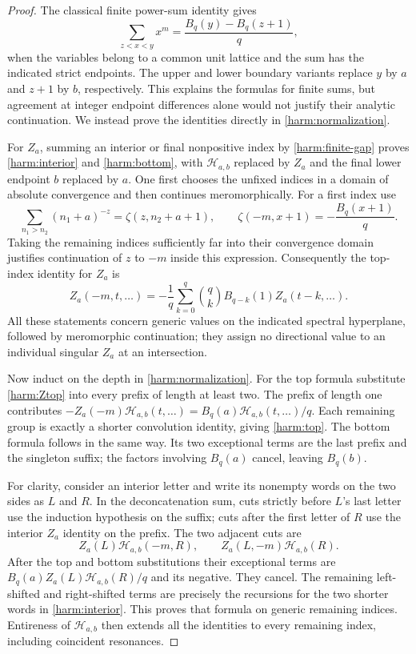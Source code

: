 \begin{proof}
The classical finite power-sum identity \cite{DLMF} gives
\begin{equation}
 \sum_{z<x<y}x^m=\frac{B_q(y)-B_q(z+1)}q,
 \label{harm:finite-gap}
\end{equation}
when the variables belong to a common unit lattice and the sum has the
indicated strict endpoints. The upper and lower boundary variants
replace $y$ by $a$ and $z+1$ by $b$, respectively. This explains the
formulas for finite sums, but agreement at integer endpoint differences
alone would not justify their analytic continuation. We instead prove
the identities directly in \eqref{harm:normalization}.

For $Z_a$, summing an interior or final nonpositive index by
\eqref{harm:finite-gap} proves \eqref{harm:interior} and
\eqref{harm:bottom}, with $\mathcal H_{a,b}$ replaced by $Z_a$ and
the final lower endpoint $b$ replaced by $a$. One first chooses the
unfixed indices in a domain of absolute convergence and then continues
meromorphically. For a first index use
\[
 \sum_{n_1>n_2}(n_1+a)^{-z}
                   =\zeta(z,n_2+a+1),\qquad
 \zeta(-m,x+1)=-\frac{B_q(x+1)}q.
\]
Taking the remaining indices sufficiently far into their convergence
domain justifies continuation of $z$ to $-m$ inside this expression.
Consequently the top-index identity for $Z_a$ is
\begin{equation}
 Z_a(-m,t,\ldots)
   =-\frac1q\sum_{k=0}^q\binom qk B_{q-k}(1)
                               Z_a(t-k,\ldots).
 \label{harm:Ztop}
\end{equation}
All these statements concern generic values on the indicated spectral
hyperplane, followed by meromorphic continuation; they assign no
directional value to an individual singular $Z_a$ at an intersection.

Now induct on the depth in \eqref{harm:normalization}. For the top
formula substitute \eqref{harm:Ztop} into every prefix of length at
least two. The prefix of length one contributes
$-Z_a(-m)\mathcal H_{a,b}(t,\ldots)
 =B_q(a)\mathcal H_{a,b}(t,\ldots)/q$.
Each remaining group is exactly a shorter convolution identity, giving
\eqref{harm:top}. The bottom formula follows in the same way. Its
two exceptional terms are the last prefix and the singleton suffix;
the factors involving $B_q(a)$ cancel, leaving $B_q(b)$.

For clarity, consider an interior letter and write its nonempty words
on the two sides as $L$ and $R$. In the deconcatenation sum, cuts
strictly before $L$'s last letter use the induction hypothesis on the
suffix; cuts after the first letter of $R$ use the interior $Z_a$
identity on the prefix. The two adjacent cuts are
\[
 Z_a(L)\mathcal H_{a,b}(-m,R),\qquad
 Z_a(L,-m)\mathcal H_{a,b}(R).
\]
After the top and bottom substitutions their exceptional terms are
$B_q(a)Z_a(L)\mathcal H_{a,b}(R)/q$ and its negative.
They cancel. The remaining left-shifted and right-shifted terms are
precisely the recursions for the two shorter words in
\eqref{harm:interior}. This proves that formula on generic remaining
indices. Entireness of $\mathcal H_{a,b}$ then extends all the
identities to every remaining index, including coincident resonances.
\end{proof}

